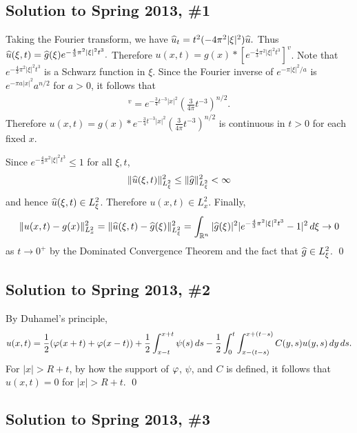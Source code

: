 \subsection*{Solution to Spring 2013, \#1}\label{s131}
Taking the Fourier transform, we have $\widehat{u}_{t} = t^{2}(-4\pi^{2}|\xi|^{2})\widehat{u}.$
Thus
$\widehat{u}(\xi, t) = \widehat{g}(\xi)e^{-\frac{4}{3}\pi^{2}|\xi|^{2}t^{3}}.$
Therefore
$u(x, t) = g(x) \ast [e^{-\frac{4}{3}\pi^{2}|\xi|^{2}t^{3}}]^{v}$.
Note that $e^{-\frac{4}{3}\pi^{2}|\xi|^{2}t^{3}}$ is a Schwarz function in $\xi$. Since the Fourier inverse of $e^{-\pi|\xi|^{2}/a}$ is $e^{-\pi a|x|^{2}}a^{n/2}$
for $a > 0$, it follows that
\begin{align*}
[e^{-\frac{4}{3}\pi^{2}|\xi|^{2}t^{3}}]^{v} = e^{-\frac{3}{4}t^{-3}|x|^{2}}(\frac{3}{4\pi}t^{-3})^{n/2}.
\end{align*}
Therefore
$u(x, t) = g(x) \ast e^{-\frac{3}{4}t^{-3}|x|^{2}}(\frac{3}{4\pi}t^{-3})^{n/2}$ is continuous in $t > 0$ for each fixed $x$.

Since $e^{-\frac{4}{3}\pi^{2}|\xi|^{2}t^{3}} \leq 1$ for all $\xi, t$, $$\| \widehat{u}(\xi, t) \|_{L^{2}_{\xi}}^{2} \leq \| \widehat{g} \|_{L^{2}_{\xi}}^{2} < \infty$$
and hence $\widehat{u}(\xi, t) \in L^{2}_{\xi}$. Therefore $u(x, t) \in L^{2}_{x}$.
Finally,
\begin{align*}
\| u(x, t) - g(x) \|_{L^{2}_{x}}^{2} = \| \widehat{u}(\xi, t) - \widehat{g}(\xi) \|_{L^{2}_{\xi}}^{2} = \int_{\mathbb{R}^{n}}|\widehat{g}(\xi)|^{2}|e^{-\frac{4}{3}\pi^{2}|\xi|^{2}t^{3}} - 1|^{2}\, d\xi \rightarrow 0
\end{align*}
as $t \rightarrow 0^{+}$ by the Dominated Convergence Theorem and the fact that $\widehat{g} \in L_{\xi}^{2}$. \hfill\qed

\subsection*{Solution to Spring 2013, \#2}\label{s132}
By Duhamel's principle,
\begin{align*}
u(x, t) = \frac{1}{2}(\varphi(x + t) + \varphi(x - t)) + \frac{1}{2}\int_{x - t}^{x + t}\psi(s)\, ds -\frac{1}{2}\int_{0}^{t}\int_{x - (t - s)}^{x + (t -s)}C(y, s)u(y, s)\, dy\, ds.
\end{align*}
For $|x| > R + t$, by how the support of $\varphi$, $\psi$, and $C$ is defined, it follows that $u(x, t) = 0$ for $|x| > R + t$.
\hfill\qed

\subsection*{Solution to Spring 2013, \#3}\label{s133}
